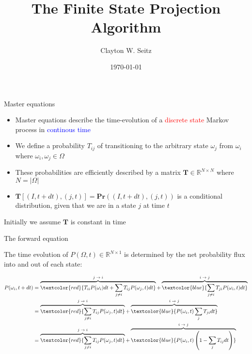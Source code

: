 \documentclass{beamer}					%
\title{The Finite State Projection Algorithm}	%
\author{Clayton W. Seitz}								%
\date{\today}									%
\begin{document}
\begin{frame}
  \titlepage
\end{frame}


\begin{frame}{Master equations}
\begin{itemize}
\item Master equations describe the time-evolution of a \textcolor{red}{discrete state} Markov process in \textcolor{blue}{continous time}\\
\vspace{0.1in}
\item We define a probability $T_{ij}$ of transitioning to the arbitrary state $\omega_{j}$ from $\omega_{i}$ where $\omega_{i},\omega_{j}\in \Omega$\\
\vspace{0.1in}
\item These probabilities are efficiently described by a matrix $\mathbf{T}\in\mathbb{R}^{N\times N}$ where $N = |\Omega|$\\
\vspace{0.1in}
\item $\mathbf{T}[(I,t+dt),(j,t)]=\mathbf{Pr}\left((I,t+dt),(j,t)\right)$ is a conditional distribution, given that we are in a state $j$ at time $t$
\end{itemize}
\vspace{0.2in}
Initially we assume $\bm{T}$ is constant in time
\end{frame}

\begin{frame}{The forward equation}

\vspace{0.2in}
The time evolution of $P(\Omega,t) \in \mathbb{R}^{N\times 1}$ is determined by the net probability flux into and out of each state:\\
\vspace{0.1in}

\begin{align*}
P(\omega_{i},t+dt) &= \overbrace{\textcolor{red}{T_{ii}P(\omega_{i})dt + \sum_{j\neq i} T_{ij}P(\omega_{j},t)dt}}^\text{$j\rightarrow i$} + \overbrace{\textcolor{blue}{\sum_{j\neq i}T_{ji}P(\omega_{i},t)dt}}^\text{$i\rightarrow j$}\\
&= \overbrace{\textcolor{red}{\sum_{j\neq i} T_{ij}P(\omega_{j},t)dt}}^\text{$j\rightarrow i$} + \overbrace{\textcolor{blue}{P(\omega_{i},t)\sum_{j}T_{ji}dt}}^\text{$i\rightarrow j$}\\
&=  \overbrace{\textcolor{red}{\sum_{j\neq i} T_{ij}P(\omega_{j},t)dt}}^\text{$j\rightarrow i$} + \overbrace{\textcolor{blue}{P(\omega_{i},t)\left(1-\sum_{j}T_{ij}dt\right)}}^\text{$i\rightarrow j$}\\
\end{align*}

\end{frame}
\end{document}
